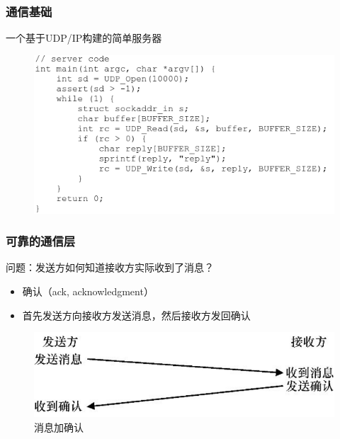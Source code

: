 \begin{frame}[fragile]
    \frametitle{通信基础}
    一个基于UDP/IP构建的简单服务器
    \begin{figure}
        \includegraphics[width=0.8\linewidth]{figs/udp-server.png}
    \end{figure}
\end{frame}
\begin{frame}[fragile]
    \frametitle{可靠的通信层}
    问题：发送方如何知道接收方实际收到了消息？ \pause
    \begin{itemize}
        \item 确认（ack, acknowledgment）
        \item 首先发送方向接收方发送消息，然后接收方发回确认
    \end{itemize}
    
    \begin{figure}
        \includegraphics[width=0.8\linewidth]{figs/ack.png}
        \caption{消息加确认}
    \end{figure}
\end{frame}

